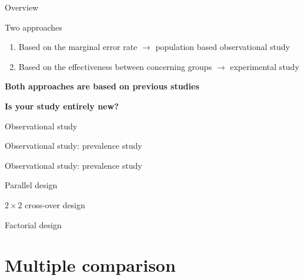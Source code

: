 \documentclass[9pt,ignorenonframetext,xcolor=dvipsnames]{beamer}
\providecommand{\tightlist}{%
  \setlength{\itemsep}{0pt}\setlength{\parskip}{0pt}}
\newlength{\wideitemsep}
\let\olditem\item
\renewcommand{\item}{\setlength{\itemsep}{\wideitemsep}\olditem}
\begin{document}
\begin{frame}{Overview}

\begin{block}{Two approaches}

\begin{enumerate}
\def\labelenumi{\arabic{enumi}.}
\tightlist
\item
  Based on the marginal error rate \(\rightarrow\) population based
  observational study
\item
  Based on the effectiveness between concerning groups \(\rightarrow\)
  experimental study
\end{enumerate}

\textbf{Both approaches are based on previous studies}

\textbf{Is your study entirely new?}

\end{block}

\end{frame}

\begin{frame}{Observational study}

\end{frame}

\begin{frame}{Observational study: prevalence study}

\end{frame}

\begin{frame}{Observational study: prevalence study}

\end{frame}

\begin{frame}{Parallel design}

\end{frame}

\begin{frame}{\(2\times 2\) cross-over design}

\end{frame}

\begin{frame}{Factorial design}

\end{frame}

\section{Multiple comparison}\label{multiple-comparison}
\end{document}
